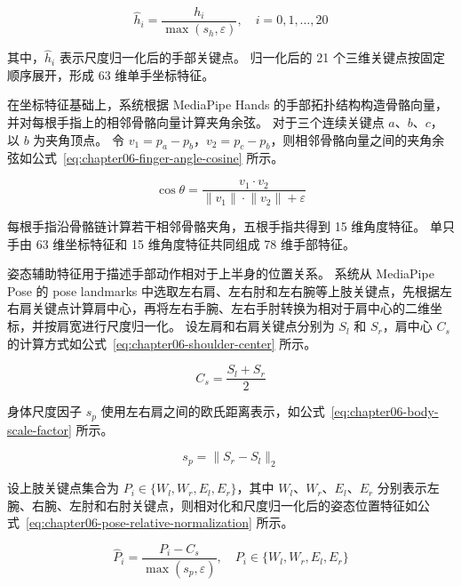 \begin{equation}
\hat{h}_i = \frac{h_i}{\max(s_h,\varepsilon)},\quad i=0,1,\ldots,20
\label{eq:chapter06-hand-landmark-normalization}
\end{equation}

其中，$\hat{h}_i$ 表示尺度归一化后的手部关键点。
归一化后的 21 个三维关键点按固定顺序展开，形成 63 维单手坐标特征。

在坐标特征基础上，系统根据 MediaPipe Hands 的手部拓扑结构构造骨骼向量，并对每根手指上的相邻骨骼向量计算夹角余弦。
对于三个连续关键点 $a$、$b$、$c$，以 $b$ 为夹角顶点。
令 $v_1=p_a-p_b$，$v_2=p_c-p_b$，则相邻骨骼向量之间的夹角余弦如公式~\ref{eq:chapter06-finger-angle-cosine} 所示。

\begin{equation}
\cos\theta = \frac{v_1 \cdot v_2}{\lVert v_1\rVert \cdot \lVert v_2\rVert + \varepsilon}
\label{eq:chapter06-finger-angle-cosine}
\end{equation}

每根手指沿骨骼链计算若干相邻骨骼夹角，五根手指共得到 15 维角度特征。
单只手由 63 维坐标特征和 15 维角度特征共同组成 78 维手部特征。

姿态辅助特征用于描述手部动作相对于上半身的位置关系。
系统从 MediaPipe Pose 的 pose landmarks 中选取左右肩、左右肘和左右腕等上肢关键点，先根据左右肩关键点计算肩中心，再将左右手腕、左右手肘转换为相对于肩中心的二维坐标，并按肩宽进行尺度归一化。
设左肩和右肩关键点分别为 $S_l$ 和 $S_r$，肩中心 $C_s$ 的计算方式如公式~\ref{eq:chapter06-shoulder-center} 所示。

\begin{equation}
C_s = \frac{S_l + S_r}{2}
\label{eq:chapter06-shoulder-center}
\end{equation}

身体尺度因子 $s_p$ 使用左右肩之间的欧氏距离表示，如公式~\ref{eq:chapter06-body-scale-factor} 所示。

\begin{equation}
s_p = \lVert S_r - S_l \rVert_2
\label{eq:chapter06-body-scale-factor}
\end{equation}

设上肢关键点集合为 $P_i\in\{W_l,W_r,E_l,E_r\}$，其中 $W_l$、$W_r$、$E_l$、$E_r$ 分别表示左腕、右腕、左肘和右肘关键点，则相对化和尺度归一化后的姿态位置特征如公式~\ref{eq:chapter06-pose-relative-normalization} 所示。

\begin{equation}
\hat{P}_i = \frac{P_i - C_s}{\max(s_p,\varepsilon)},\quad P_i\in\{W_l,W_r,E_l,E_r\}
\label{eq:chapter06-pose-relative-normalization}
\end{equation}

